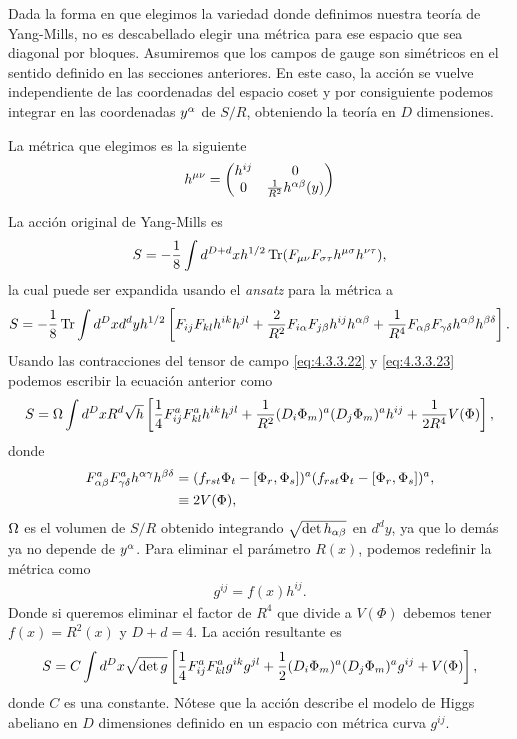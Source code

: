 Dada la forma en que elegimos la variedad donde definimos nuestra teoría de Yang-Mills, no es descabellado elegir una métrica para ese espacio que sea diagonal por bloques. Asumiremos que los campos de gauge son simétricos en el sentido definido en las secciones anteriores. En este caso, la acción se vuelve independiente de las coordenadas del espacio coset y por consiguiente podemos integrar en las coordenadas $y^\alpha$ de $S/R$, obteniendo la teoría en $D$ dimensiones.

La métrica que elegimos es la siguiente
\begin{align}
	h^{\mu\nu} = \begin{pmatrix}
	h^{ij} & 0\\
	0 & \frac{1}{R^2}h^{\alpha\beta}(y)
	\end{pmatrix}
\end{align}

La acción original de Yang-Mills es
\begin{align}
	S = -\frac{1}{8}\int d^{D+d}x h^{1/2}\operatorname{Tr}(F_{\mu\nu}F_{\sigma\tau}h^{\mu\sigma}h^{\nu\tau}),
\end{align}
la cual puede ser expandida usando el \emph{ansatz} para la métrica a
\begin{align}
	S = -\frac{1}{8}\operatorname{Tr}\int d^Dx d^dy h^{1/2}\left[F_{ij}F_{kl}h^{ik}h^{jl}+\frac{2}{R^2}F_{i\alpha}F_{j\beta}h^{ij}h^{\alpha\beta}+\frac{1}{R^4}F_{\alpha\beta}F_{\gamma\delta}h^{\alpha\beta}h^{\beta\delta}\right].
\end{align}
Usando las contracciones del tensor de campo \eqref{eq:4.3.3.22} y \eqref{eq:4.3.3.23} podemos escribir la ecuación anterior como
\begin{align}
	S = \Omega\int d^Dx R^{d}\sqrt{h}\left[\frac{1}{4} F_{ij}^a F_{kl}^a h^{ik}h^{jl}+\frac{1}{R^2}(D_i\Phi_m)^a(D_j\Phi_m)^a h^{ij}+\frac{1}{2R^4}V(\Phi)\right],
\end{align}
donde
\begin{align}\nonumber
	F_{\alpha\beta}^aF_{\gamma\delta}^a h^{\alpha\gamma}h^{\beta\delta} &= (f_{rst}\Phi_t-[\Phi_r,\Phi_s])^a(f_{rst}\Phi_t-[\Phi_r,\Phi_s])^a,\\
	&\equiv 2V(\Phi),
\end{align}
$\Omega$ es el volumen de $S/R$ obtenido integrando $\sqrt{\det h_{\alpha\beta}}$ en $d^dy$, ya que lo demás ya no depende de $y^{\alpha}$. Para eliminar el parámetro $R(x)$, podemos redefinir la métrica como
\begin{align}
	g^{ij} = f(x)h^{ij}.
\end{align}
Donde si queremos eliminar el factor de $R^4$ que divide a $V(\Phi)$ debemos tener $f(x)=R^2(x)$ y $D+d=4$. La acción resultante es
\begin{align}
	S = C\int d^Dx \sqrt{\det g}\left[\frac{1}{4} F^a_{ij}F^a_{kl}g^{ik}g^{jl}+\frac{1}{2}(D_i\Phi_m)^a(D_j\Phi_m)^ag^{ij}+V(\Phi)\right],
\end{align}
donde $C$ es una constante. Nótese que la acción describe el modelo de Higgs abeliano en $D$ dimensiones definido en un espacio con métrica curva $g^{ij}$.


